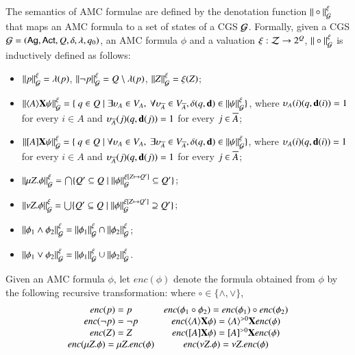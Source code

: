 The semantics of AMC formulae are defined by the denotation function $\|\circ\|_{\mathcal{G}}^\xi$ that maps an AMC formula to a set of states of a CGS $\mathcal{G}$.
Formally, given a CGS  $\mathcal{G}=(\textsf{Ag},\textsf{Act}, Q, \delta,\lambda,q_0)$, an AMC formula $\phi$ and a valuation $\xi:\mathcal{Z}\rightarrow 2^Q$,
$\|\circ\|_{\mathcal{G}}^\xi$ is inductively defined as follows:

\begin{itemize}
  \item $\|{p}\|_{\mathcal{G}}^\xi=\lambda(p)$, $\|{\neg p}\|_{\mathcal{G}}^\xi=Q\setminus \lambda(p)$, $\|{Z}\|_{\mathcal{G}}^\xi=\xi(Z)$;
  \item $\|{\langle{A}\rangle{\bf X} \psi}\|_{\mathcal{G}}^\xi= \{ \ q\in Q\mid \exists \upsilon_A\in V_A, \ \forall \upsilon_{\overline{A}}\in V_{\overline{A}},  \delta(q,{\bf d})\in \|{\psi}\|_{\mathcal{G}}^\xi \}$, where $\upsilon_A(i)(q,{\bf d}(i))=1$ for every $i\in A$ and $\upsilon_{\overline{A}}(j)(q,{\bf d}(j))=1$ for every $j\in \overline{A}$;
  \item $\|{[{A}]{\bf X} \psi}\|_{\mathcal{G}}^\xi= \{ \ q\in Q\mid \forall \upsilon_A\in V_A, \ \exists \upsilon_{\overline{A}}\in V_{\overline{A}}, \delta(q,{\bf d})\in \|{\psi}\|_{\mathcal{G}}^\xi \}$, where $\upsilon_A(i)(q,{\bf d}(i))=1$ for every $i\in A$ and $\upsilon_{\overline{A}}(j)(q,{\bf d}(j))=1$ for every $j\in \overline{A}$;
  \item $\|{\mu Z. \phi}\|_{\mathcal{G}}^\xi=\bigcap\{Q'\subseteq Q\mid \|{\phi}\|_{\mathcal{G}}^{\xi[Z\mapsto Q']}\subseteq Q'\}$;
  \item	$\|{\nu Z. \phi}\|_{\mathcal{G}}^\xi=\bigcup\{Q'\subseteq Q\mid \|{\phi}\|_{\mathcal{G}}^{\xi[Z\mapsto Q']}\supseteq Q'\}$;
  \item $\|{\phi_1\wedge \phi_2}\|_{\mathcal{G}}^\xi=\|{\phi_1}\|_{\mathcal{G}}^\xi\cap\|{\phi_2}\|_{\mathcal{G}}^\xi$;
 \item $\|{\phi_1\vee \phi_2}\|_{\mathcal{G}}^\xi=\|{\phi_1}\|_{\mathcal{G}}^\xi\cup\|{\phi_2}\|_{\mathcal{G}}^\xi$.
\end{itemize}

Given an AMC formula $\phi$, let $enc(\phi)$ denote the formula obtained from $\phi$ by the following recursive transformation:
where $\circ\in\{\wedge,\vee\}$,
\[\begin{array}{cc}
  enc(p)=p &  enc(\phi_1\circ \phi_2)=enc(\phi_1)\circ enc(\phi_2) \\
  enc(\neg p)=\neg p & enc(\langle{A}\rangle{\bf X} \phi) = \langle{A}\rangle^{>0}{\bf X} enc(\phi) \\
  enc(Z)=Z & enc([{A}]{\bf X} \phi) = [{A}]^{>0}{\bf X} enc(\phi)\\
  enc( \mu Z.\phi)= \mu Z.enc(\phi)   & enc( \nu Z.\phi)= \nu Z.enc(\phi)
\end{array}\]

